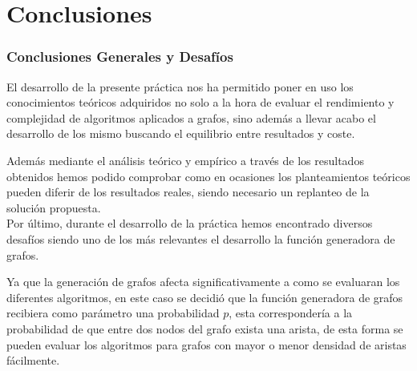 \part{Conclusiones}

\section{Conclusiones Generales y Desafíos}

El desarrollo de la presente práctica nos ha permitido poner en uso los conocimientos teóricos adquiridos no solo a la hora de evaluar el rendimiento y complejidad de algoritmos aplicados a grafos, sino además a llevar acabo el desarrollo de los mismo buscando el equilibrio entre resultados y coste.

Además mediante el análisis teórico y empírico a través de los resultados obtenidos hemos podido comprobar como en ocasiones los planteamientos teóricos pueden diferir de los resultados reales, siendo necesario un replanteo de la solución propuesta.\\

Por último, durante el desarrollo de la práctica hemos encontrado diversos desafíos siendo uno de los más relevantes el desarrollo la función generadora de grafos.

Ya que la generación de grafos afecta significativamente a como se evaluaran los diferentes algoritmos, en este caso se decidió que la función generadora de grafos recibiera como parámetro una probabilidad $p$, esta correspondería a la probabilidad de que entre dos nodos del grafo exista una arista, de esta forma se pueden evaluar los algoritmos para grafos con mayor o menor densidad de aristas fácilmente.


